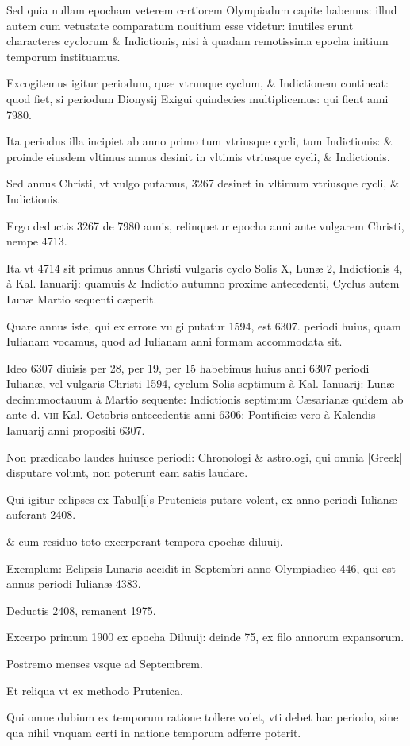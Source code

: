 \begin{parnumbers}

Sed quia nullam epocham veterem certiorem Olympiadum capite habemus: illud autem  cum vetustate comparatum nouitium esse videtur: inutiles erunt characteres cyclorum \& Indictionis, nisi à quadam remotissima epocha initium temporum instituamus.

Excogitemus igitur periodum, quæ vtrunque cyclum, \& Indictionem contineat: quod fiet, si periodum Dionysij Exigui quindecies multiplicemus: qui fient anni 7980.

Ita periodus illa incipiet ab anno primo tum vtriusque cycli, tum Indictionis: \& proinde eiusdem vltimus annus desinit in vltimis vtriusque cycli, \& Indictionis.

Sed annus Christi, vt vulgo putamus, 3267 desinet in vltimum vtriusque cycli, \& Indictionis.

Ergo deductis 3267 de 7980 annis, relinquetur epocha anni ante vulgarem  Christi, nempe 4713.

Ita vt 4714 sit primus annus Christi vulgaris cyclo Solis \textsc{X}, Lunæ 2, Indictionis 4, à Kal. Ianuarij: quamuis \& Indictio autumno proxime antecedenti, Cyclus autem Lunæ Martio sequenti cæperit.

Quare annus iste, qui ex errore vulgi putatur 1594, est 6307. periodi huius, quam Iulianam vocamus, quod ad Iulianam anni formam accommodata sit.

Ideo 6307 diuisis per 28, per 19, per 15 habebimus huius anni 6307 periodi Iulianæ, vel vulgaris Christi 1594, cyclum Solis septimum à Kal. Ianuarij: Lunæ decimumoctauum à Martio sequente: Indictionis septimum Cæsarianæ quidem ab ante d. \textsc{viii} Kal. Octobris antecedentis anni 6306: Pontificiæ vero à  Kalendis Ianuarij anni propositi 6307.

Non prædicabo laudes huiusce periodi: Chronologi \& astrologi, qui omnia \textgreek{[Greek]} disputare volunt, non poterunt eam satis laudare.

Qui igitur eclipses ex Tabul[i]s Prutenicis putare volent, ex anno periodi Iulianæ auferant 2408.

\& cum residuo toto excerperant tempora epochæ diluuij.

Exemplum: Eclipsis Lunaris accidit in Septembri anno Olympiadico 446, qui est annus periodi Iulianæ 4383.

Deductis 2408, remanent 1975.

Excerpo primum 1900 ex epocha Diluuij: deinde 75, ex filo annorum expansorum.

Postremo menses vsque ad Septembrem.

Et reliqua vt ex methodo Prutenica.

Qui omne dubium ex temporum ratione tollere volet, vti debet hac periodo, sine qua nihil vnquam certi in natione  temporum adferre poterit.

\end{parnumbers}
